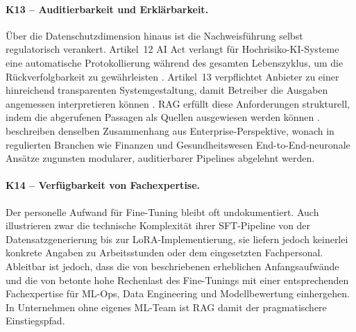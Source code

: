 \paragraph{K13 -- Auditierbarkeit und Erklärbarkeit.}\label{krit:k13}
Über die Datenschutzdimension hinaus ist die Nachweisführung selbst regulatorisch verankert. Artikel~12 AI Act verlangt für Hochrisiko-KI-Systeme eine automatische Protokollierung während des gesamten Lebenszyklus, um die Rückverfolgbarkeit zu gewährleisten \autocite[Art.~12]{EuropaischesParlamentundRat.2024}. Artikel~13 verpflichtet Anbieter zu einer hinreichend transparenten Systemgestaltung, damit Betreiber die Ausgaben angemessen interpretieren können \autocite[Art.~13]{EuropaischesParlamentundRat.2024}. RAG erfüllt diese Anforderungen strukturell, indem die abgerufenen Passagen als Quellen ausgewiesen werden können \autocite[14]{Gao.2024}. \textcite[20]{Karakurt.2026} beschreiben denselben Zusammenhang aus Enterprise-Perspektive, wonach in regulierten Branchen wie Finanzen und Gesundheitswesen End-to-End-neuronale Ansätze zugunsten modularer, auditierbarer Pipelines abgelehnt werden.

\paragraph{K14 -- Verfügbarkeit von Fachexpertise.}\label{krit:k14}
Der personelle Aufwand für Fine-Tuning bleibt oft undokumentiert. Auch \textcite[10]{Balaguer.2024} illustrieren zwar die technische Komplexität ihrer SFT-Pipeline von der Datensatzgenerierung bis zur LoRA-Implementierung, sie liefern jedoch keinerlei konkrete Angaben zu Arbeitsstunden oder dem eingesetzten Fachpersonal.
Ableitbar ist jedoch, dass die von \textcite[3]{Balaguer.2024} beschriebenen erheblichen Anfangsaufwände und die von \textcite[14]{Karakurt.2026} betonte hohe Rechenlast des Fine-Tunings mit einer entsprechenden Fachexpertise für ML-Ops, Data Engineering und Modellbewertung einhergehen. In Unternehmen ohne eigenes ML-Team ist RAG damit der pragmatischere Einstiegspfad.

